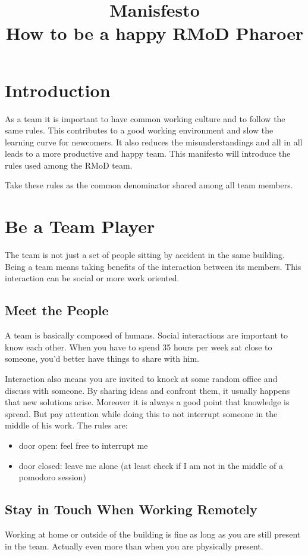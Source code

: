 \documentclass[10pt]{article}
\begin{document}
\title{Manisfesto\\How to be a happy RMoD Pharoer}
\author{}
\date{}
\maketitle

\section*{Introduction}
As a team it is important to have common working culture and to follow the same rules. This contributes to a good working environment and slow the learning curve for newcomers. It also reduces the misunderstandings and all in all leads to a more productive and happy team. This manifesto will introduce the rules used among the RMoD team. 

Take these rules as the common denominator shared among all team members.

\section{Be a Team Player}
The team is not just a set of people sitting by accident in the same building. Being a team means taking benefits of the interaction between its members.
This interaction can be social or more work oriented.

\subsection{Meet the People}
A team is basically composed of humans. Social interactions are important to know each other. When you have to spend 35 hours per week sat close to someone, you'd better have things to share with him.

Interaction also means you are invited to knock at some random office and discuss with someone. By sharing  ideas and confront them, it usually happens that new solutions arise. Moreover it is always a good point that knowledge is spread. But pay attention while doing this to not interrupt someone in the middle of his work.
The rules are:
\begin{itemize}
	\item door open: feel free to interrupt me
	\item door closed: leave me alone (at least check if I am not in the middle of a pomodoro session)
\end{itemize}

\subsection{Stay in Touch When Working Remotely}
Working at home or outside of the building is fine as long as you are still present in the team. Actually even more than when you are physically present.
\end{document}
